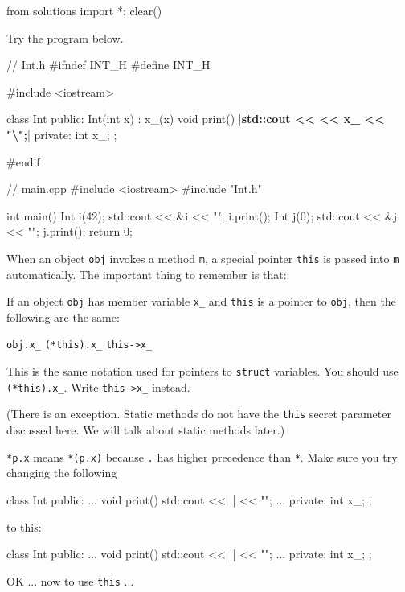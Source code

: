 \begin{python0}
from solutions import *; clear()
\end{python0}

Try the program below.

\begin{consolethree}[escapeinside=||]
// Int.h
#ifndef INT_H
#define INT_H

#include <iostream>

class Int
{
public:
    Int(int x) : x_(x) {}
    void print()
    {
        |\textbf{std::cout <<  << x\_ << "\textbackslash ";}|
    }
private:
    int x_;
};

#endif
\end{consolethree}

\begin{consolethree}[escapeinside=||]
// main.cpp
#include <iostream>
#include "Int.h"

int main()
{
    Int i(42);
    std::cout << &i << "\n";
    i.print();
    Int j(0);
    std::cout << &j << "\n";
    j.print();
    return 0;
}
\end{consolethree}

When an object \texttt{obj} invokes a method \texttt{m}, a special pointer
\texttt{this} is passed into \texttt{m} automatically. The important thing
to remember is that:


If an object \texttt{obj} has member variable \texttt{x\_} and \texttt{this}
is a pointer to \texttt{obj}, then the following are the same:

\texttt{obj.x\_} \hspace{1cm} \texttt{(*this).x\_} \hspace{1cm} \texttt{this->x\_}

This is the same notation used for pointers to \texttt{struct} variables.
You should  use \texttt{(*this).x\_}. Write
\texttt{this->x\_} instead.

(There is an exception. Static methods do not have the \texttt{this}
secret parameter discussed here. We will talk about static methods
later.)

 \texttt{*p.x} means \texttt{*(p.x)} because \texttt{.} has
higher precedence than \texttt{*}. Make sure you try changing the
following

\begin{consolethree}[escapeinside=||]
class Int
{
public:
    ...
    void print()
    {
        std::cout << || << "\n";
    }
    ...
private:
    int x_;
};
\end{consolethree}
to this:

\begin{consolethree}[escapeinside=||]
class Int
{
public:
    ...
    void print()
    {
        std::cout << || << "\n";
    }
    ...
private:
    int x_;
};
\end{consolethree}
OK ... now to use \texttt{this} ...



